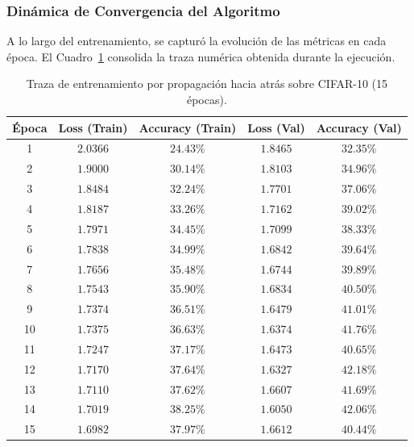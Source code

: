 \documentclass[12pt]{article}
\begin{document}
\subsubsection{Dinámica de Convergencia del Algoritmo}
A lo largo del entrenamiento, se capturó la evolución de las métricas en cada época. El Cuadro~\ref{tab:training_log} consolida la traza numérica obtenida durante la ejecución.

\begin{table}[H]
	\centering
	\caption{Traza de entrenamiento por propagación hacia atrás sobre CIFAR-10 (15 épocas).}
	\label{tab:training_log}
	\vspace{0.2cm}
	\begin{tabular}{|c|c|c|c|c|}
		\hline
		\textbf{Época} & \textbf{Loss (Train)} & \textbf{Accuracy (Train)} & \textbf{Loss (Val)} & \textbf{Accuracy (Val)} \\ \hline
		1  & $2.0366$ & $24.43\%$ & $1.8465$ & $32.35\%$ \\ \hline
		2  & $1.9000$ & $30.14\%$ & $1.8103$ & $34.96\%$ \\ \hline
		3  & $1.8484$ & $32.24\%$ & $1.7701$ & $37.06\%$ \\ \hline
		4  & $1.8187$ & $33.26\%$ & $1.7162$ & $39.02\%$ \\ \hline
		5  & $1.7971$ & $34.45\%$ & $1.7099$ & $38.33\%$ \\ \hline
		6  & $1.7838$ & $34.99\%$ & $1.6842$ & $39.64\%$ \\ \hline
		7  & $1.7656$ & $35.48\%$ & $1.6744$ & $39.89\%$ \\ \hline
		8  & $1.7543$ & $35.90\%$ & $1.6834$ & $40.50\%$ \\ \hline
		9  & $1.7374$ & $36.51\%$ & $1.6479$ & $41.01\%$ \\ \hline
		10 & $1.7375$ & $36.63\%$ & $1.6374$ & $41.76\%$ \\ \hline
		11 & $1.7247$ & $37.17\%$ & $1.6473$ & $40.65\%$ \\ \hline
		12 & $1.7170$ & $37.64\%$ & $1.6327$ & $\mathbf{42.18\%}$ \\ \hline
		13 & $1.7110$ & $37.62\%$ & $1.6607$ & $41.69\%$ \\ \hline
		14 & $1.7019$ & $38.25\%$ & $\mathbf{1.6050}$ & $42.06\%$ \\ \hline
		15 & $\mathbf{1.6982}$ & $\mathbf{37.97\%}$ & $1.6612$ & $40.44\%$ \\ \hline
	\end{tabular}
\end{table}
\end{document}

